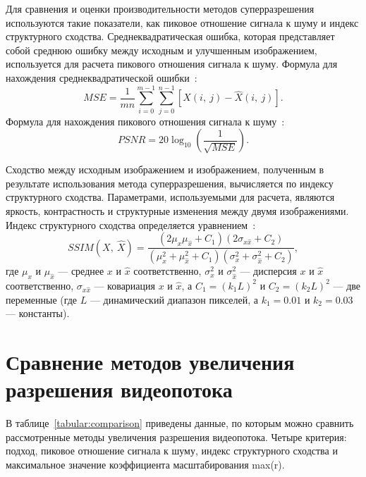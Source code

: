 \documentclass{bmstu}
\begin{document}
Для сравнения и оценки производительности методов суперразрешения используются такие показатели, как пиковое отношение сигнала к шуму и индекс структурного сходства. 
Среднеквадратическая ошибка, которая представляет собой среднюю ошибку между исходным и улучшенным изображением, используется для расчета пикового отношения сигнала к шуму. 
Формула для нахождения среднеквадратической ошибки~\cite{Daithankar2021}:
\begin{equation}
MSE = \frac{1}{mn} \sum_{i = 0}^{m - 1} \sum_{j = 0}^{n - 1} [X(i,~j) - \hat{X}(i,~j)].
\end{equation}
Формула для нахождения пикового отношения сигнала к шуму~\cite{Daithankar2021}:
\begin{equation}
PSNR = 20 \log_{10}(\frac{1}{\sqrt{MSE}}).
\end{equation}

Сходство между исходным изображением и изображением, полученным в результате использования метода суперразрешения, вычисляется по индексу структурного сходства. 
Параметрами, используемыми для расчета, являются яркость, контрастность и структурные изменения между двумя изображениями. 
Индекс структурного сходства определяется уравнением~\cite{Daithankar2021}:
\begin{equation}
SSIM(X,~\hat{X}) = \frac{(2 \mu_x \mu_{\hat{x}} + C_1)(2 \sigma_{x \hat{x}} + C_2)}{(\mu_x^2 + \mu_{\hat{x}}^2 + C_1)(\sigma_x^2 + \sigma_{\hat{x}}^2 + C_2)},
\end{equation}
где $\mu_x$ и $\mu_{\hat{x}}$ --- среднее $x$ и $\hat{x}$ соответственно, $\sigma_x^2$ и $\sigma_{\hat{x}}^2$ --- дисперсия $x$ и $\hat{x}$ соответственно, $\sigma_{x \hat{x}}$ --- ковариация $x$ и $\hat{x}$, а $C_1 = (k_1 L)^2$ и $C_2 = (k_2 L)^2$ --- две переменные (где $L$ --- динамический диапазон пикселей, а $k_1 = 0.01$ и $k_2 = 0.03$ --- константы).

\section{Сравнение методов увеличения разрешения видеопотока}

В таблице~\ref{tabular:comparison} приведены данные, по которым можно сравнить рассмотренные методы увеличения разрешения видеопотока. 
Четыре критерия: подход, пиковое отношение сигнала к шуму, индекс структурного сходства и максимальное значение коэффициента масштабирования max(r).
\end{document}
